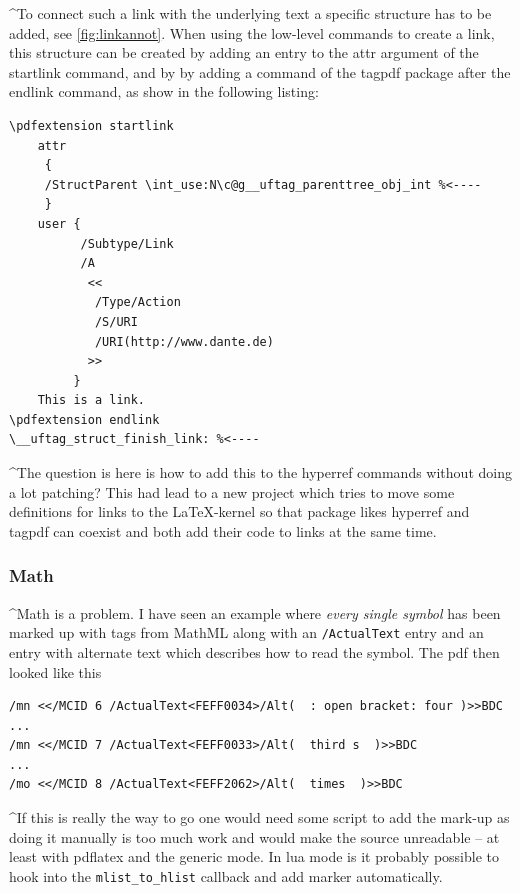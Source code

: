 \documentclass[DIV=12,parskip=half-,bibliography=totoc]{scrartcl}
\begin{document}
\TagP^To connect such a link with the underlying text a specific structure has to be added, see \ref{fig:linkannot}. When using the low-level commands to create a link, this structure can be created by adding an entry to the attr argument of the startlink command, and by by adding a command of the tagpdf package after the endlink command, as show in the following listing:\TagPend

\begin{lstlisting}
\pdfextension startlink
    attr
     {
     /StructParent \int_use:N\c@g__uftag_parenttree_obj_int %<----
     }
    user {
          /Subtype/Link
          /A
           <<
            /Type/Action
            /S/URI
            /URI(http://www.dante.de)
           >>
         }
    This is a link.
\pdfextension endlink
\__uftag_struct_finish_link: %<----
\end{lstlisting}
\tagmcend\tagstructend

\TagP^The question is here is how to add this to the hyperref commands without doing a lot patching? This had lead to a new project which tries to move some definitions for links to the \LaTeX-kernel so that package likes hyperref and tagpdf can coexist and both add their code to links at the same time.\TagPend

\subsubsection{Math}

\TagP^Math is a problem. I have seen an example where \emph{every single symbol} has been marked up with tags from MathML along with an \texttt{/ActualText} entry and an entry with alternate text which describes how to read the symbol.
The pdf then looked like this\TagPend

\begin{lstlisting}
/mn <</MCID 6 /ActualText<FEFF0034>/Alt(  : open bracket: four )>>BDC
...
/mn <</MCID 7 /ActualText<FEFF0033>/Alt(  third s  )>>BDC
...
/mo <</MCID 8 /ActualText<FEFF2062>/Alt(  times  )>>BDC
\end{lstlisting}
\tagmcend\tagstructend


\TagP^If this is really the way to go one would need some script to add the mark-up as doing it manually is too much work and would make the source unreadable -- at least with pdflatex and the generic mode. In lua mode is it probably possible to hook into the \texttt{mlist\_to\_hlist} callback and add marker automatically.\TagPend
\end{document}
